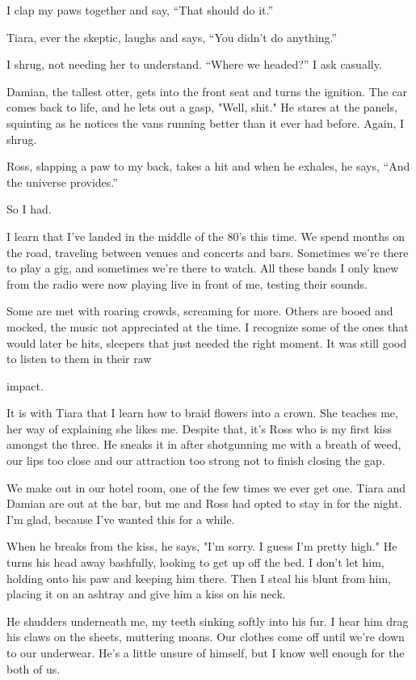 I clap my paws together and say, ``That should do it.''

Tiara, ever the skeptic, laughs and says, ``You didn't do anything.''

I shrug, not needing her to understand. ``Where we headed?'' I ask
casually.

Damian, the tallest otter, gets into the front seat and turns the
ignition. The car comes back to life, and he lets out a gasp, "Well,
shit." He stares at the panels, squinting as he notices the vans running
better than it ever had before. Again, I shrug.

Ross, slapping a paw to my back, takes a hit and when he exhales, he
says, ``And the universe provides.''

So I had.

I learn that I've landed in the middle of the 80's this time. We spend
months on the road, traveling between venues and concerts and bars.
Sometimes we're there to play a gig, and sometimes we're there to watch.
All these bands I only knew from the radio were now playing live in
front of me, testing their sounds.

Some are met with roaring crowds, screaming for more. Others are booed
and mocked, the music not appreciated at the time. I recognize some of
the ones that would later be hits, sleepers that just needed the right
moment. It was still good to listen to them in their raw

impact.

It is with Tiara that I learn how to braid flowers into a crown. She
teaches me, her way of explaining she likes me. Despite that, it's Ross
who is my first kiss amongst the three. He sneaks it in after
shotgunning me with a breath of weed, our lips too close and our
attraction too strong not to finish closing the gap.

We make out in our hotel room, one of the few times we ever get one.
Tiara and Damian are out at the bar, but me and Ross had opted to stay
in for the night. I'm glad, because I've wanted this for a while.

When he breaks from the kiss, he says, "I'm sorry. I guess I'm pretty
high." He turns his head away bashfully, looking to get up off the bed.
I don't let him, holding onto his paw and keeping him there. Then I
steal his blunt from him, placing it on an ashtray and give him a kiss
on his neck.

He shudders underneath me, my teeth sinking softly into his fur. I hear
him drag his claws on the sheets, muttering moans. Our clothes come off
until we're down to our underwear. He's a little unsure of himself, but
I know well enough for the both of us.


